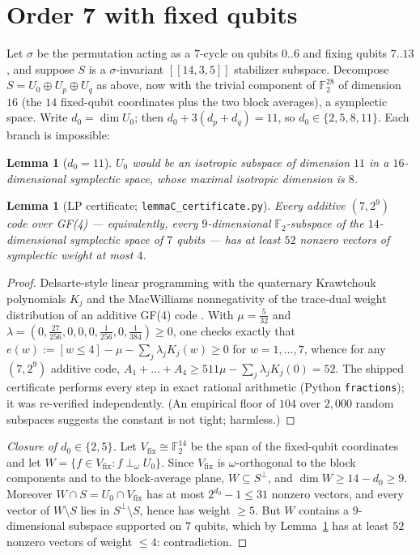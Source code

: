 \documentclass[11pt]{amsart}
\newcommand{\FF}{\mathbb{F}_{2}}
\newcommand{\code}[3]{[[#1,#2,#3]]}
\newcommand{\Sperp}{S^{\perp}}
\theoremstyle{plain}
\newtheorem{lemma}[theorem]{Lemma}
\theoremstyle{definition}
\theoremstyle{remark}
\begin{document}
\section{Order 7 with fixed qubits}\label{sec:order7fixed}

Let $\sigma$ be the permutation acting as a $7$-cycle on qubits
$0..6$ and fixing qubits $7..13$, and suppose $S$ is a
$\sigma$-invariant $\code{14}{3}{5}$ stabilizer subspace. Decompose
$S=U_{0}\oplus U_{p}\oplus U_{q}$ as above, now with the trivial
component of $\FF^{28}$ of dimension $16$ (the $14$ fixed-qubit
coordinates plus the two block averages), a symplectic space. Write
$d_{0}=\dim U_{0}$; then $d_{0}+3(d_{p}+d_{q})=11$, so
$d_{0}\in\{2,5,8,11\}$. Each branch is impossible:

\begin{lemma}[$d_{0}=11$]\label{lem:A}
$U_{0}$ would be an isotropic subspace of dimension $11$ in a
$16$-dimensional symplectic space, whose maximal isotropic dimension is
$8$.
\end{lemma}

\begin{lemma}[LP certificate; \texttt{lemmaC\_certificate.py}]\label{lem:C}
Every additive $(7,2^{9})$ code over GF(4) --- equivalently, every
$9$-dimensional $\FF$-subspace of the $14$-dimensional symplectic space
of $7$ qubits --- has at least $52$ nonzero vectors of symplectic weight
at most $4$.
\end{lemma}

\begin{proof}
Delsarte-style linear programming \cite{Delsarte} with the quaternary
Krawtchouk polynomials $K_{j}$ and the MacWilliams nonnegativity of the
trace-dual weight distribution of an additive GF(4) code \cite{CRSS}.
With $\mu=\tfrac{5}{32}$ and
$\lambda=(0,\tfrac{27}{256},0,0,0,\tfrac{1}{256},0,\tfrac{1}{384})\ge0$,
one checks exactly that
$e(w):=[w\le4]-\mu-\sum_{j}\lambda_{j}K_{j}(w)\ge0$ for $w=1,\dots,7$,
whence for any $(7,2^{9})$ additive code,
$A_{1}+\dots+A_{4}\ge 511\mu-\sum_{j}\lambda_{j}K_{j}(0)=52$.
The shipped certificate performs every step in exact rational
arithmetic (Python \texttt{fractions}); it was re-verified independently.
(An empirical floor of $104$ over $2{,}000$ random subspaces suggests the
constant is not tight; harmless.)
\end{proof}

\begin{proof}[Closure of $d_{0}\in\{2,5\}$]
Let $V_{\mathrm{fix}}\cong\FF^{14}$ be the span of the fixed-qubit
coordinates and let
$W=\{f\in V_{\mathrm{fix}}: f\perp_{\omega} U_{0}\}$. Since
$V_{\mathrm{fix}}$ is $\omega$-orthogonal to the block components and to
the block-average plane, $W\subseteq\Sperp$, and
$\dim W\ge 14-d_{0}\ge 9$. Moreover $W\cap S=U_{0}\cap V_{\mathrm{fix}}$
has at most $2^{d_{0}}-1\le31$ nonzero vectors, and every vector of
$W\setminus S$ lies in $\Sperp\setminus S$, hence has weight $\ge5$. But
$W$ contains a $9$-dimensional subspace supported on $7$ qubits, which by
Lemma~\ref{lem:C} has at least $52$ nonzero vectors of weight $\le4$:
contradiction.
\end{proof}
\end{document}
